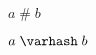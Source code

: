 \documentclass[varwidth, border = 3pt]{standalone}
\begin{document}
$a \mathrel{\#} b$

$a \mathrel{\varhash} b$
\end{document}
